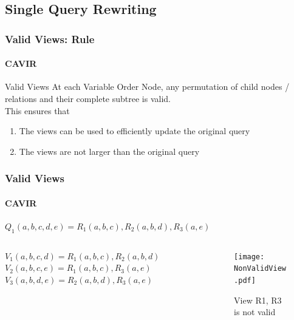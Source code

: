 \documentclass[
	11pt, %
]{beamer}
\begin{document}
\subsection{Single Query Rewriting}
\begin{frame}
	\frametitle{Valid Views: Rule}
	\framesubtitle{CAVIR}
	\begin{block}{Valid Views}
		At each Variable Order Node, any permutation of child nodes / relations and their complete subtree is valid.\\
		This ensures that
		\begin{enumerate}
			\item The views can be used to efficiently update the original query
			\item The views are not larger than the original query
		\end{enumerate}
	\end{block}
\end{frame}
\begin{frame}
	\frametitle{Valid Views}
	\framesubtitle{CAVIR}
	$Q_1(a, b, c, d, e) = R_1(a, b, c), R_2(a, b, d), R_3(a, e)$
\begin{columns}[c] 
	\begin{column}{0.5\textwidth} 
		$V_1(a, b, c, d) = R_1(a, b, c), R_2(a, b, d)$ \\
		$V_2(a, b, c, e) = R_1(a,b, c), R_3(a, e)$
		$V_3(a, b ,d ,e) = R_2(a, b ,d), R_3(a, e)$
	\end{column}
	\begin{column}{0.45\textwidth} 
		\begin{figure}
			\texttt{[image: NonValidView.pdf]}
			\caption{View R1, R3 is not valid}
		\end{figure}
	\end{column}
\end{columns}
\end{frame}
\end{document}

